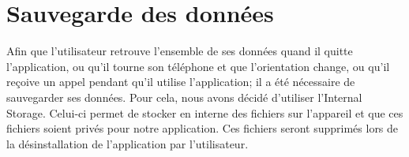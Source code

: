 \documentclass[a4paper,10pt]{article}
\begin{document}
\newpage
\section{Sauvegarde des données}
Afin que l'utilisateur retrouve l'ensemble de ses données quand il quitte l'application, ou qu'il tourne son téléphone et que l'orientation change, ou qu'il reçoive un appel pendant qu'il utilise l'application; il a été nécessaire de sauvegarder ses données. Pour cela, nous avons décidé d'utiliser l'Internal Storage. Celui-ci permet de stocker en interne des fichiers sur l'appareil et que ces fichiers soient privés pour notre application. Ces fichiers seront supprimés lors de la désinstallation de l'application par l'utilisateur.
\end{document}

